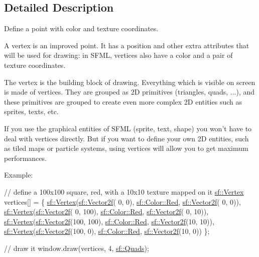 \subsection{Detailed Description}
Define a point with color and texture coordinates. 

A vertex is an improved point. It has a position and other extra attributes that will be used for drawing\-: in S\-F\-M\-L, vertices also have a color and a pair of texture coordinates.

The vertex is the building block of drawing. Everything which is visible on screen is made of vertices. They are grouped as 2\-D primitives (triangles, quads, ...), and these primitives are grouped to create even more complex 2\-D entities such as sprites, texts, etc.

If you use the graphical entities of S\-F\-M\-L (sprite, text, shape) you won't have to deal with vertices directly. But if you want to define your own 2\-D entities, such as tiled maps or particle systems, using vertices will allow you to get maximum performances.

Example\-: 
\begin{DoxyCode}
\textcolor{comment}{// define a 100x100 square, red, with a 10x10 texture mapped on it}
\hyperlink{classsf_1_1_vertex}{sf::Vertex} vertices[] =
\{
    \hyperlink{classsf_1_1_vertex}{sf::Vertex}(\hyperlink{classsf_1_1_vector2}{sf::Vector2f}(  0,   0), \hyperlink{classsf_1_1_color_a7052b1c5408a953e25f9691e0e828c9d}{sf::Color::Red}, 
      \hyperlink{classsf_1_1_vector2}{sf::Vector2f}( 0,  0)),
    \hyperlink{classsf_1_1_vertex}{sf::Vertex}(\hyperlink{classsf_1_1_vector2}{sf::Vector2f}(  0, 100), \hyperlink{classsf_1_1_color_a7052b1c5408a953e25f9691e0e828c9d}{sf::Color::Red}, 
      \hyperlink{classsf_1_1_vector2}{sf::Vector2f}( 0, 10)),
    \hyperlink{classsf_1_1_vertex}{sf::Vertex}(\hyperlink{classsf_1_1_vector2}{sf::Vector2f}(100, 100), \hyperlink{classsf_1_1_color_a7052b1c5408a953e25f9691e0e828c9d}{sf::Color::Red}, 
      \hyperlink{classsf_1_1_vector2}{sf::Vector2f}(10, 10)),
    \hyperlink{classsf_1_1_vertex}{sf::Vertex}(\hyperlink{classsf_1_1_vector2}{sf::Vector2f}(100,   0), \hyperlink{classsf_1_1_color_a7052b1c5408a953e25f9691e0e828c9d}{sf::Color::Red}, 
      \hyperlink{classsf_1_1_vector2}{sf::Vector2f}(10,  0))
\};

\textcolor{comment}{// draw it}
window.draw(vertices, 4, \hyperlink{group__graphics_gga5ee56ac1339984909610713096283b1bac968add05250b2cf59350dc68043a3c0}{sf::Quads});
\end{DoxyCode}


